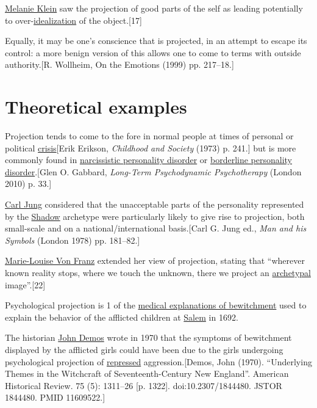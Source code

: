 \documentclass{book}
\numberwithin{equation}{section}
\begin{document}
%
\href{https://en.wikipedia.org/wiki/Melanie_Klein}{Melanie Klein} saw the projection of good parts of the self as leading potentially to over-\href{https://en.wikipedia.org/wiki/Idealisation_and_devaluation}{idealization} of the object.[17]

Equally, it may be one's conscience that is projected, in an attempt to escape its control: a more benign version of this allows one to come to terms with outside authority.[R. Wollheim, On the Emotions (1999) pp. 217--18.]

\section{Theoretical examples}
Projection tends to come to the fore in normal people at times of personal or political \href{https://en.wikipedia.org/wiki/Crisis}{crisis}[Erik Erikson, \textit{Childhood and Society} (1973) p. 241.] but is more commonly found in \href{https://en.wikipedia.org/wiki/Narcissistic_personality_disorder}{narcissistic personality disorder} or \href{https://en.wikipedia.org/wiki/Borderline_personality_disorder}{borderline personality disorder}.[Glen O. Gabbard, \textit{Long-Term Psychodynamic Psychotherapy} (London 2010) p. 33.]

%
\href{https://en.wikipedia.org/wiki/Carl_Jung}{Carl Jung} considered that the unacceptable parts of the personality represented by the \href{https://en.wikipedia.org/wiki/Shadow_(psychology)}{Shadow} archetype were particularly likely to give rise to projection, both small-scale and on a national/international basis.[Carl G. Jung ed., \textit{Man and his Symbols} (London 1978) pp. 181--82.]

\href{https://en.wikipedia.org/wiki/Marie-Louise_Von_Franz}{Marie-Louise Von Franz} extended her view of projection, stating that ``wherever known reality stops, where we touch the unknown, there we project an \href{https://en.wikipedia.org/wiki/Archetype}{archetypal} image''.[22]

%
Psychological projection is 1 of the \href{https://en.wikipedia.org/wiki/Medical_explanations_of_bewitchment}{medical explanations of bewitchment} used to explain the behavior of the afflicted children at \href{https://en.wikipedia.org/wiki/Salem_witch_trials}{Salem} in 1692.

The historian \href{https://en.wikipedia.org/wiki/John_Demos}{John Demos} wrote in 1970 that the symptoms of bewitchment displayed by the afflicted girls could have been due to the girls undergoing psychological projection of \href{https://en.wikipedia.org/wiki/Repression_(psychology)}{repressed} aggression.[Demos, John (1970). ``Underlying Themes in the Witchcraft of Seventeenth-Century New England''. American Historical Review. 75 (5): 1311--26 [p. 1322]. doi:10.2307/1844480. JSTOR 1844480. PMID 11609522.]
\end{document}
